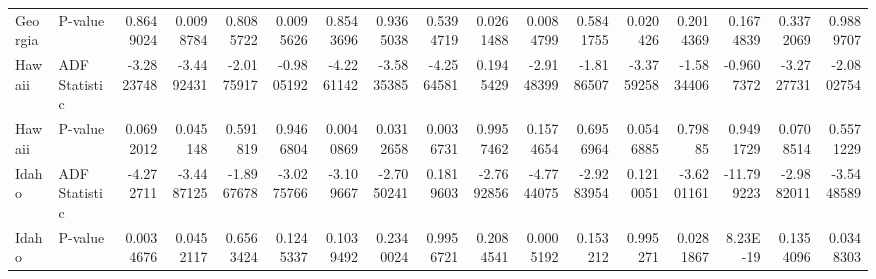 \begin{table}
{\begin{tabular}{llrrrrrrrrrrrrrrr}
            Georgia     & P-value       & 0.8649024                           & 0.0098784                & 0.8085722                & 0.0095626                & 0.8543696                  & 0.9365038                & 0.5394719                  & 0.0261488               & 0.0084799               & 0.5841755                  & 0.020426                   & 0.2014369                 & 0.1674839                 & 0.3372069                        & 0.9889707                        \\
            Hawaii      & ADF Statistic & -3.2823748                          & -3.4492431               & -2.0175917               & -0.9805192               & -4.2261142                 & -3.5835385               & -4.2564581                 & 0.1945429               & -2.9148399              & -1.8186507                 & -3.3759258                 & -1.5834406                & -0.9607372                & -3.2727731                       & -2.0802754                       \\
            Hawaii      & P-value       & 0.0692012                           & 0.045148                 & 0.591819                 & 0.9466804                & 0.0040869                  & 0.0312658                & 0.0036731                  & 0.9957462               & 0.1574654               & 0.6956964                  & 0.0546885                  & 0.79885                   & 0.9491729                 & 0.0708514                        & 0.5571229                        \\
            Idaho       & ADF Statistic & -4.272711                           & -3.4487125               & -1.8967678               & -3.0275766               & -3.109667                  & -2.7050241               & 0.1819603                  & -2.7692856              & -4.7744075              & -2.9283954                 & 0.1210051                  & -3.6201161                & -11.799223                & -2.9882011                       & -3.5448589                       \\
            Idaho       & P-value       & 0.0034676                           & 0.0452117                & 0.6563424                & 0.1245337                & 0.1039492                  & 0.2340024                & 0.9956721                  & 0.2084541               & 0.0005192               & 0.153212                   & 0.995271                   & 0.0281867                 & 8.23E-19                  & 0.1354096                        & 0.0348303                        \\

\end{tabular}}
\end{table}
